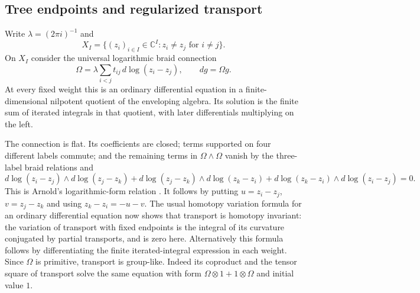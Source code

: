 \documentclass[11pt]{article}
\theoremstyle{definition}
\theoremstyle{remark}
\numberwithin{equation}{section}
\begin{document}
\subsection{Tree endpoints and regularized transport}
Write $\lambda=(2\pi i)^{-1}$ and
\[
 X_I=\{(z_i)_{i\in I}\in\mathbb C^I:z_i\ne z_j\text{ for }i\ne j\}.
\]
On $X_I$ consider the universal logarithmic braid connection
\cite[Section~1.3]{Kohno}
\begin{equation}\label{eq:holonomy-connection}
 \Omega=\lambda\sum_{i<j}t_{ij}\,d\log(z_i-z_j),
 \qquad dg=\Omega g.
\end{equation}
At every fixed weight this is an ordinary differential equation in a
finite-dimensional nilpotent quotient of the enveloping algebra.
Its solution is the finite sum of iterated integrals in that quotient,
with later differentials multiplying on the left.

The connection is flat.  Its coefficients are closed; terms supported
on four different labels commute; and the remaining terms in
$\Omega\wedge\Omega$ vanish by the three-label braid relations and
\[
 d\log(z_i-z_j)\wedge d\log(z_j-z_k)
 +d\log(z_j-z_k)\wedge d\log(z_k-z_i)
 +d\log(z_k-z_i)\wedge d\log(z_i-z_j)=0.
\]
This is Arnold's logarithmic-form relation \cite{Arnold}.
It follows by putting $u=z_i-z_j$, $v=z_j-z_k$ and using
$z_k-z_i=-u-v$.  The usual homotopy variation formula for an ordinary
differential equation now shows that transport is homotopy invariant:
the variation of transport with fixed endpoints is the integral of
its curvature conjugated by partial transports, and is zero here.
Alternatively this formula follows by differentiating the finite
iterated-integral expression in each weight.
Since $\Omega$ is primitive, transport is group-like.  Indeed its
coproduct and the tensor square of transport solve the same equation
with form $\Omega\otimes1+1\otimes\Omega$ and initial value $1$.
\end{document}
